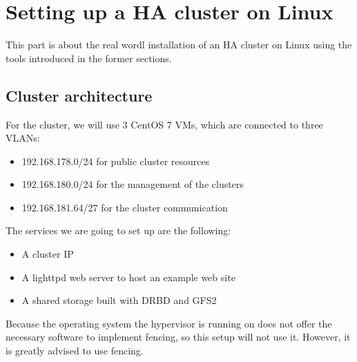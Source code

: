 \section{Setting up a HA cluster on Linux}
This part is about the real wordl installation of an \ac{HA} cluster on Linux using the tools introduced in the former sections.

\subsection{Cluster architecture}
For the cluster, we will use 3 CentOS 7 \acp{VM}, which are connected
to three \acp{VLAN}: 
\begin{itemize}
\item 192.168.178.0/24 for public cluster resources
\item 192.168.180.0/24 for the management of the clusters
\item 192.168.181.64/27 for the cluster communication
\end{itemize}
The services we are going to set up are the following:
\begin{itemize}
\item A cluster IP
\item A lighttpd web server to host an example web site
\item A shared storage built with DRBD and GFS2
\end{itemize}

Because the operating system the hypervisor is running on does
not offer the necessary software to implement fencing, so this setup will not use it. 
However, it is greatly advised to use fencing.

